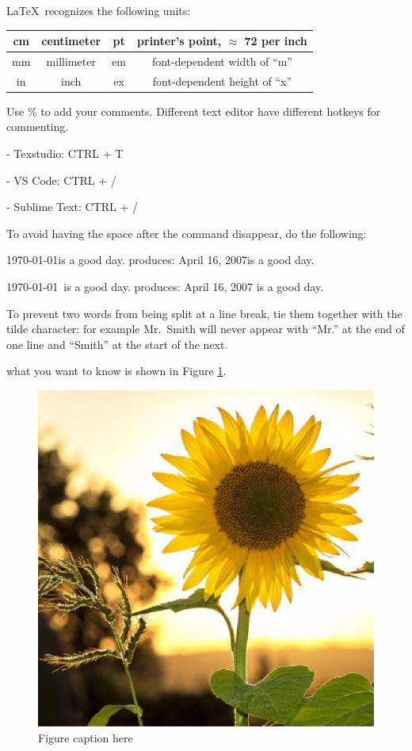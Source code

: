 \documentclass[12pt,openright]{book}
\begin{document}
\LaTeX\ recognizes the following units:
\vskip 0.2in
\begin{tabular}{|c|c||c|c|}
  \hline 
  cm & centimeter & pt & printer’s point, $\approx$ 72 per inch \\ \hline
  mm & millimeter & em & font-dependent width of “m” \\ 	\hline
  in & inch & ex & font-dependent height of “x” \\ 	\hline
\end{tabular}
\vskip 0.2in

Use \% to add your comments. Different text editor have different hotkeys for commenting.

- Texstudio: CTRL + T

- VS Code: CTRL + /

- Sublime Text: CTRL + /

To avoid having the space after the command disappear, do the following:

\today is a good day. produces: April 16, 2007is a good day.

\today\ is a good day. produces: April 16, 2007 is a good day.

To prevent two words from being split at a line break, tie them together with the tilde character: for example Mr.~Smith will never appear with “Mr.” at the end of one line and “Smith” at the start of the next.


what you want to know is shown in Figure \ref{fig:29571453.jpg}.

\begin{figure}[!htbp]
  \centering
  \includegraphics[width=\textwidth]{flower}
  \caption{Figure caption here}
  \label{fig:29571453.jpg}
\end{figure}
\end{document}
